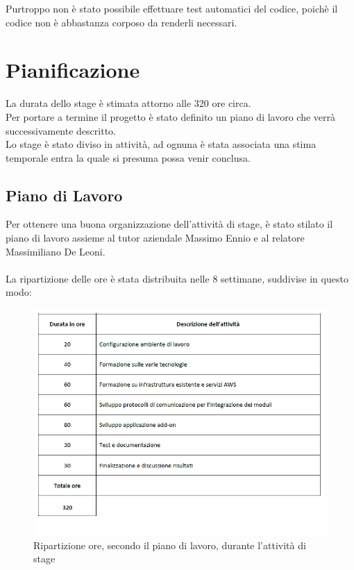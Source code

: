 Purtroppo non è stato possibile effettuare test automatici del codice, poichè il codice non è abbastanza corposo da renderli necessari.

\section{Pianificazione}
La durata dello stage è stimata attorno alle 320 ore circa.\\
Per portare a termine il progetto è stato definito un piano di lavoro che verrà successivamente descritto.\\
Lo stage è stato diviso in attività, ad ognuna è stata associata una stima temporale entra la quale si presuma possa venir conclusa.
\subsection{Piano di Lavoro}
Per ottenere una buona organizzazione dell'attività di stage, è stato stilato il piano di lavoro assieme al tutor aziendale Massimo Ennio e al relatore Massimiliano De Leoni.
\\\\La ripartizione delle ore è stata distribuita nelle 8 settimane, suddivise in questo modo:
\begin{figure}[!h] 
	\centering 
	\includegraphics[scale = 0.8]{immagini/ripartizione-ore-piano.png} 
	\caption{Ripartizione ore, secondo il piano di lavoro, durante l'attività di stage}
\end{figure}

